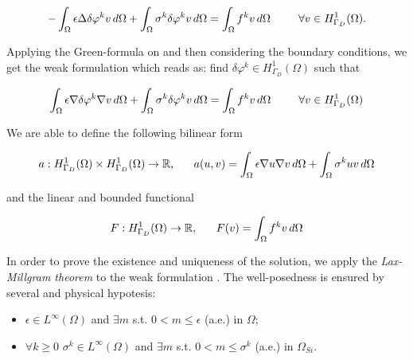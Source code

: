 \begin{equation}
\label{eq: integration first}
- \int_{\Omega} \epsilon \Delta \delta\varphi^k  v \, d\Omega + \int_{\Omega} \sigma^{k}\delta \varphi^k v \, d\Omega = \int_{\Omega} f^{k}v \, d\Omega \psp{15} \forall v \in H^1_{\Gamma_D}(\Omega).
\end{equation}

Applying the Green-formula on  and then considering the boundary conditions, we get the weak formulation which reads as: find $\delta \varphi^k \in H^1_{\Gamma_D}(\Omega)$ such that

\begin{equation}
\label{eq: NLP weakformulation}
\int_{\Omega} \epsilon \nabla \delta\varphi^k \nabla v \, d\Omega + \int_{\Omega} \sigma^{k}\delta \varphi^k v \, d\Omega = \int_{\Omega} f^{k}v \, d\Omega \psp{15} \forall v \in H^1_{\Gamma_D}(\Omega)
\end{equation}

We are able to define the following bilinear form

\begin{equation}
\label{eq: bilinear form NLP linearized}
a : H^1_{\Gamma_D}(\Omega) \times H^1_{\Gamma_D}(\Omega) \rightarrow \mathbb{R}, \psp{10} a(u,v) =  \int_{\Omega} \epsilon \nabla u \nabla v \, d\Omega + \int_{\Omega} \sigma^{k}u v \, d\Omega
\end{equation}

and the linear and bounded functional

\begin{equation}
\label{eq: functional NLP linearized}
F:H^1_{\Gamma_D}(\Omega)\rightarrow \mathbb{R}, \psp{10} F(v) = \int_{\Omega} f^{k}v \, d\Omega
\end{equation}

In order to prove the existence and uniqueness of the solution, we apply the \textit{Lax-Millgram theorem} \cite{salsa:EDP} to the weak formulation .
The well-posedness is ensured by several and physical hypotesis:

\begin{itemize}
\item $\epsilon \in L^{\infty}(\Omega)$ and $\exists m$ s.t. $0 < m \leq \epsilon$ (a.e.) in $\Omega$;
\item  $\forall k \geq 0$ $\sigma^k \in L^{\infty}(\Omega)$ and $\exists m$ s.t. $0 < m \leq \sigma^k$ (a.e.) in $\Omega_{Si}$.
\end{itemize}

